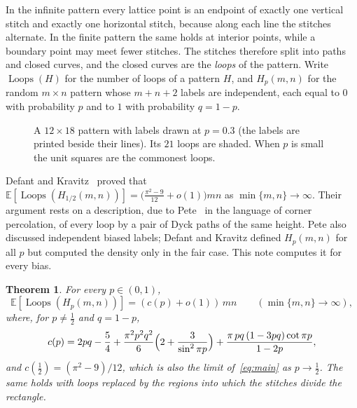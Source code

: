 \documentclass[11pt]{amsart}
\newtheorem{theorem}{Theorem}[section]
\theoremstyle{definition}
\theoremstyle{remark}
\newcommand{\Loops}{\operatorname{Loops}}
\newcommand{\E}{\mathbb{E}}
\begin{document}
In the infinite pattern every lattice point is an endpoint of exactly one vertical stitch and
exactly one horizontal stitch, because along each line the stitches alternate. In the finite pattern
the same holds at interior points, while a boundary point may meet fewer stitches. The stitches
therefore split into paths and closed curves, and the closed curves are the \emph{loops} of the
pattern. Write $\Loops(H)$ for the number of
loops of a pattern $H$, and $H_p(m,n)$ for the random $m\times n$ pattern whose $m+n+2$ labels are
independent, each equal to $0$ with probability $p$ and to $1$ with probability $q=1-p$.

\begin{figure}[t]
\centering

\caption{A $12\times18$ pattern with labels drawn at $p=0.3$ (the labels are printed beside their
lines). Its $21$ loops are shaded. When $p$ is small the unit squares are the commonest loops.}
\label{fig:pattern}
\end{figure}

Defant and Kravitz~\cite[Theorem~1.6]{DK24} proved that
$\E[\Loops(H_{1/2}(m,n))]=\bigl(\tfrac{\pi^2-9}{12}+o(1)\bigr)mn$ as $\min\{m,n\}\to\infty$. Their
argument rests on a description, due to Pete~\cite{Pet08} in the language of corner percolation, of
every loop by a pair of Dyck paths of the same height. Pete also discussed independent biased labels;
Defant and Kravitz defined $H_p(m,n)$ for all $p$ but computed the density only in the fair case. This
note computes it for every bias.

\begin{theorem}\label{thm:main}
For every $p\in(0,1)$,
\[
\E[\Loops(H_p(m,n))]=(c(p)+o(1))\,mn\qquad(\min\{m,n\}\to\infty),
\]
where, for $p\neq\tfrac12$ and $q=1-p$,
\begin{equation}\label{eq:main}
c(p)=2pq-\frac54+\frac{\pi^2p^2q^2}{6}\Bigl(2+\frac{3}{\sin^2\pi p}\Bigr)
+\frac{\pi\,pq\,(1-3pq)\cot\pi p}{1-2p},
\end{equation}
and $c(\tfrac12)=(\pi^2-9)/12$, which is also the limit of~\eqref{eq:main} as $p\to\tfrac12$. The same
holds with loops replaced by the regions into which the stitches divide the rectangle.
\end{theorem}
\end{document}
